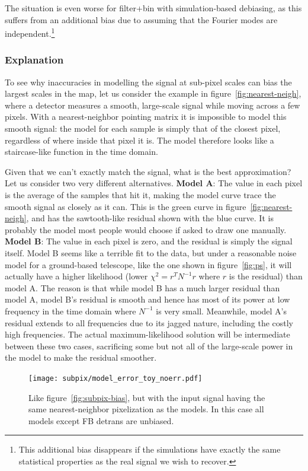 \documentclass[twocolumn,apj]{aastex63}
\newcommand{\dfn}[1]{\textbf{#1}}
\begin{document}
The situation is even worse for filter+bin with simulation-based debiasing,
as this suffers from an additional bias due to assuming that the Fourier modes
are independent.\footnote{This additional bias disappears if the simulations
have exactly the same statistical properties as the real signal we wish to
recover.}

\subsubsection{Explanation}
To see why inaccuracies in modelling the signal at sub-pixel scales can bias
the largest scales in the map, let us consider the example in figure~\ref{fig:nearest-neigh},
where a detector measures a smooth, large-scale signal while moving across a few
pixels. With a nearest-neighbor pointing matrix it is impossible to model this
smooth signal: the model for each sample is simply that of the closest pixel,
regardless of where inside that pixel it is. The model therefore looks like
a staircase-like function in the time domain.

Given that we can't exactly match the signal, what is the best approximation?
Let us consider two very different alternatives. \dfn{Model A}: The value in each pixel
is the average of the samples that hit it, making the model curve trace the
smooth signal as closely as it can. This is the green curve in figure~\ref{fig:nearest-neigh},
and has the sawtooth-like residual shown with the blue curve. It is probably the
model most people would choose if asked to draw one manually.
\dfn{Model B}: The value in each pixel is zero, and the residual is simply the signal itself.
Model B seems like a terrible fit to the data, but under a reasonable noise model
for a ground-based telescope, like the one shown in figure~\ref{fig:ps}, it
will actually have a higher likelihood (lower $\chi^2 = r^TN^{-1}r$
where $r$ is the residual) than model A. The reason is that while model B has a much
larger residual than model A, model B's residual is smooth and hence has most of its
power at low frequency in the time domain where $N^{-1}$ is very small. Meanwhile, model A's
residual extends to all frequencies due to its jagged nature, including the costly high
frequencies. The actual maximum-likelihood solution will be intermediate between these
two cases, sacrificing some but not all of the large-scale power in the model to make
the residual smoother.

\begin{figure}
	\centering
	\hspace*{-5mm}\texttt{[image: subpix/model\_error\_toy\_noerr.pdf]}
	\caption{
		Like figure~\ref{fig:subpix-bias}, but with the input signal
		having the same nearest-neighbor pixelization as the models.
		In this case all models except FB detrans are unbiased.
	}
	\label{fig:subpix-noerr}
\end{figure}
\end{document}
